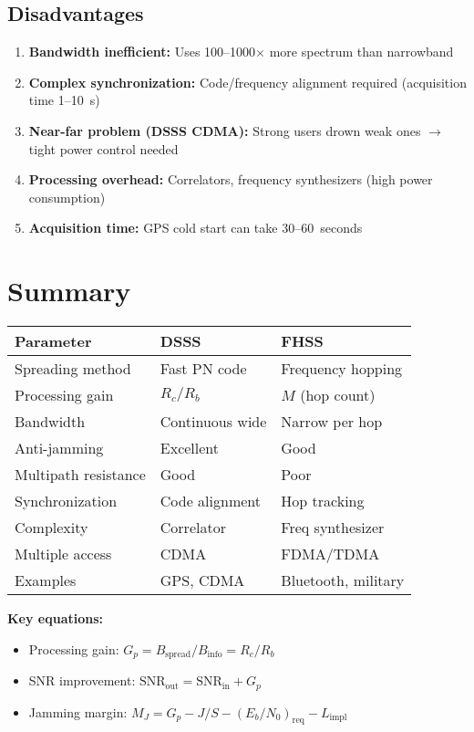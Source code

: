 \subsection*{Disadvantages}

\begin{enumerate}
\item \textbf{Bandwidth inefficient:} Uses 100--1000$\times$ more spectrum than narrowband
\item \textbf{Complex synchronization:} Code/frequency alignment required (acquisition time 1--10~s)
\item \textbf{Near-far problem (DSSS CDMA):} Strong users drown weak ones $\rightarrow$ tight power control needed
\item \textbf{Processing overhead:} Correlators, frequency synthesizers (high power consumption)
\item \textbf{Acquisition time:} GPS cold start can take 30--60~seconds
\end{enumerate}

\section{Summary}

\begin{center}
\begin{tabular}{@{}lll@{}}
\toprule
\textbf{Parameter} & \textbf{DSSS} & \textbf{FHSS} \\
\midrule
Spreading method & Fast PN code & Frequency hopping \\
Processing gain & $R_c/R_b$ & $M$ (hop count) \\
Bandwidth & Continuous wide & Narrow per hop \\
Anti-jamming & Excellent & Good \\
Multipath resistance & Good & Poor \\
Synchronization & Code alignment & Hop tracking \\
Complexity & Correlator & Freq synthesizer \\
Multiple access & CDMA & FDMA/TDMA \\
Examples & GPS, CDMA & Bluetooth, military \\
\bottomrule
\end{tabular}
\end{center}

\textbf{Key equations:}
\begin{itemize}
\item Processing gain: $G_p = B_{\mathrm{spread}}/B_{\mathrm{info}} = R_c/R_b$
\item SNR improvement: $\mathrm{SNR}_{\mathrm{out}} = \mathrm{SNR}_{\mathrm{in}} + G_p$
\item Jamming margin: $M_J = G_p - J/S - (E_b/N_0)_{\mathrm{req}} - L_{\mathrm{impl}}$
\end{itemize}

